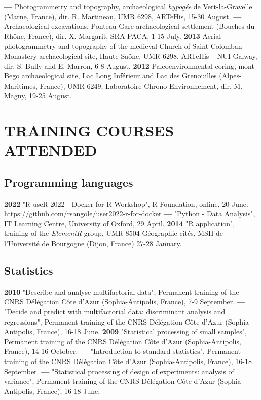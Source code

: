 \documentclass{article}
\begin{document}
\smallbreak
\textbf{--- }Photogrammetry and topography, archaeological \textit{hypog\'{e}e} de Vert-la-Gravelle (Marne, France), dir. R. Martineau, UMR 6298, ARTeHis, 15-30 August.
\smallbreak
\textbf{--- }Archaeological excavations, Ponteau-Gare archaeological settlement (Bouches-du-Rh\^{o}ne, France), dir. X. Margarit, SRA-PACA, 1-15 July.\smallbreak
\textbf{2013 }Aerial\textbf{ }photogrammetry and topography of the medieval Church of Saint Colomban Monastery archaeological site, Haute-Sa\^{o}ne, UMR 6298, ARTeHis -- NUI Galway, dir. S. Bully and E. Marron, 6-8 August.
\smallbreak
\textbf{2012 }Paleoenvironmental coring, mont Bego archaeological site, Lac Long Inf\'{e}rieur and Lac des Grenouilles (Alpes-Maritimes, France), UMR 6249, Laboratoire Chrono-Environnement, dir. M. Magny, 19-25 August.

\section*{TRAINING COURSES ATTENDED}

\subsection*{Programming languages}

\textbf{2022 }"\textsf{R} useR 2022 - Docker for R Workshop", R Foundation, online, 20 June. https://github.com/rsangole/user2022-r-for-docker
\smallbreak
\textbf{--- }"\textsf{Python} - Data Analysis", IT Learning Centre, University of Oxford, 29 April.
\smallbreak
\textbf{2014 }"\textsf{R} application", training of the \textit{ElementR} group, UMR 8504 G\'{e}ographie-cit\'{e}s, MSH de l'Universit\'{e} de Bourgogne (Dijon, France) 27-28 January.
\smallbreak

\subsection*{Statistics }

\textbf{2010 }"Describe and analyse multifactorial data", Permanent training of the CNRS D\'{e}l\'{e}gation C\^{o}te d'Azur (Sophia-Antipolis, France), 7-9 September.
\smallbreak
\textbf{--- }"Decide and predict with multifactorial data: discriminant analysis and regressions", Permanent training of the CNRS D\'{e}l\'{e}gation C\^{o}te d'Azur (Sophia-Antipolis, France), 16-18 June.
\smallbreak
\textbf{2009 }"Statistical processing of small samples", Permanent training of the CNRS D\'{e}l\'{e}gation C\^{o}te d'Azur (Sophia-Antipolis, France), 14-16 October.
\smallbreak
\textbf{--- }"Introduction to standard statistics", Permanent training of the CNRS D\'{e}l\'{e}gation C\^{o}te d'Azur (Sophia-Antipolis, France), 16-18 September.
\smallbreak
\textbf{--- }"Statistical processing of design of experiments: analysis of variance", Permanent training of the CNRS D\'{e}l\'{e}gation C\^{o}te d'Azur (Sophia-Antipolis, France), 16-18 June.
\smallbreak
\end{document}
